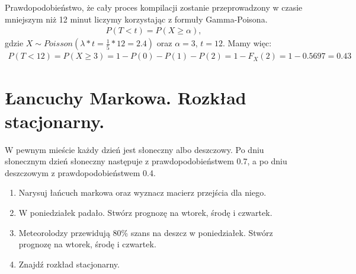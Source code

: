 \documentclass[main.tex]{subfiles}
\begin{document}
    Prawdopodobieństwo, że cały proces kompilacji zostanie przeprowadzony w
    czasie mniejszym niż 12 minut liczymy korzystając z formuły Gamma-Poisona.
    \begin{align*}
        P(T < t) = P(X \geq \alpha),
    \end{align*}
    gdzie $X \sim Poisson(\lambda*t = \frac{1}{5} * 12 = 2.4)$ oraz $\alpha = 3$, $t = 12$. Mamy więc:
    \begin{align*}
        P(T < 12) = P (X \geq 3) = 1 - P(0) - P(1) - P(2) = 1 - F_X(2) = 1 - 0.5697 = 0.43
    \end{align*}

    \newpage

    \section{Łancuchy Markowa. Rozkład stacjonarny.}
    \begin{exercise}
        W pewnym mieście każdy dzień jest słoneczny albo deszczowy. Po dniu słonecznym dzień słoneczny
        następuje z prawdopodobieństwem 0.7, a po dniu deszczowym z prawdopodobieństwem 0.4.
        \begin{enumerate}
            \item Narysuj łańcuch markowa oraz wyznacz macierz przejścia dla niego.
            \item W poniedziałek padało. Stwórz prognozę na wtorek, środę i czwartek.
            \item Meteorolodzy przewidują 80\% szans na deszcz w poniedziałek. Stwórz prognozę na wtorek, środę i czwartek.
            \item Znajdź rozkład stacjonarny.
        \end{enumerate}
    \end{exercise}
\end{document}
